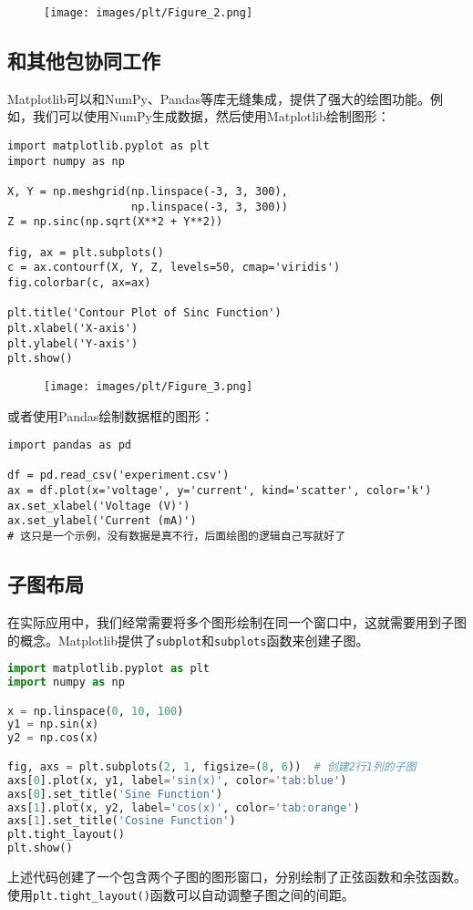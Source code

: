 \documentclass[../main.tex]{subfiles}
\begin{document}
\begin{figure}[ht]
  \centering
  \texttt{[image: images/plt/Figure\_2.png]}
\end{figure}

\subsection{和其他包协同工作}

Matplotlib可以和NumPy、Pandas等库无缝集成，提供了强大的绘图功能。例如，我们可以使用NumPy生成数据，然后使用Matplotlib绘制图形：
\begin{lstlisting}
import matplotlib.pyplot as plt
import numpy as np

X, Y = np.meshgrid(np.linspace(-3, 3, 300),
                   np.linspace(-3, 3, 300))
Z = np.sinc(np.sqrt(X**2 + Y**2))

fig, ax = plt.subplots()
c = ax.contourf(X, Y, Z, levels=50, cmap='viridis')
fig.colorbar(c, ax=ax)

plt.title('Contour Plot of Sinc Function')
plt.xlabel('X-axis')
plt.ylabel('Y-axis')
plt.show()
\end{lstlisting}

\begin{figure}[ht]
  \centering
  \texttt{[image: images/plt/Figure\_3.png]}
\end{figure}

或者使用Pandas绘制数据框的图形：
\begin{lstlisting}
import pandas as pd

df = pd.read_csv('experiment.csv')
ax = df.plot(x='voltage', y='current', kind='scatter', color='k')
ax.set_xlabel('Voltage (V)')
ax.set_ylabel('Current (mA)')
# 这只是一个示例，没有数据是真不行，后面绘图的逻辑自己写就好了
\end{lstlisting}

\subsection{子图布局}

在实际应用中，我们经常需要将多个图形绘制在同一个窗口中，这就需要用到子图的概念。Matplotlib提供了\texttt{subplot}和\texttt{subplots}函数来创建子图。

\begin{lstlisting}[language=python]
import matplotlib.pyplot as plt
import numpy as np

x = np.linspace(0, 10, 100)
y1 = np.sin(x)
y2 = np.cos(x)

fig, axs = plt.subplots(2, 1, figsize=(8, 6))  # 创建2行1列的子图
axs[0].plot(x, y1, label='sin(x)', color='tab:blue')
axs[0].set_title('Sine Function')
axs[1].plot(x, y2, label='cos(x)', color='tab:orange')
axs[1].set_title('Cosine Function')
plt.tight_layout()
plt.show()
\end{lstlisting}
上述代码创建了一个包含两个子图的图形窗口，分别绘制了正弦函数和余弦函数。\\使用\texttt{plt.tight\_layout()}函数可以自动调整子图之间的间距。
\end{document}
